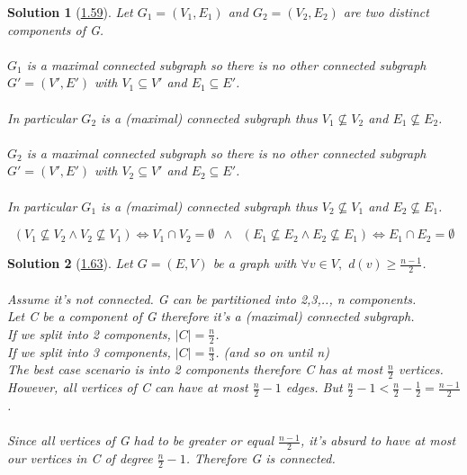 \documentclass[10pt]{report}
\numberwithin{dummy}{section}
\theoremstyle{ocrenumbox}
\newtheorem{definitionTT}{Solution}[]
\theoremstyle{grayman}
\newenvironment{sol}{\begin{sBox}\begin{definitionTT}}{\end{definitionTT}\end{sBox}}
\begin{document}
\begin{sol}[\hypertarget{so159}{\hyperlink{exo159}{1.59}}]
Let $G_1 = (V_1, E_1)$ and $G_2 = (V_2, E_2)$ are two distinct components of G.\\ \\
$G_1$ is a maximal connected subgraph so there is no other connected subgraph $G' = (V', E')$ with $V_1 \subseteq V'$ and $E_1 \subseteq E'$.\\ \\
In particular $G_2$ is a (maximal) connected subgraph thus $V_1 \not\subseteq V_2$ and $E_1 \not\subseteq E_2$.\\ \\
$G_2$ is a maximal connected subgraph so there is no other connected subgraph $G' = (V', E')$ with $V_2 \subseteq V'$ and $E_2 \subseteq E'$.\\ \\
In particular $G_1$ is a (maximal) connected subgraph thus $V_2 \not\subseteq V_1$ and $E_2 \not\subseteq E_1$.

\[\left( V_1 \not\subseteq V_2 \wedge V_2 \not\subseteq V_1\right) \Longleftrightarrow V_1 \cap V_2 = \emptyset \phantom{a} \wedge \phantom{a} \left( E_1 \not\subseteq E_2 \wedge E_2 \not\subseteq E_1\right) \Longleftrightarrow E_1 \cap E_2 = \emptyset\]
\end{sol}
\begin{sol}[\hypertarget{so163}{\hyperlink{exo163}{1.63}}]
Let $G=(E,V)$ be a graph with $\forall v \in V,$ $d(v) \geq \frac{n-1}{2}$.\\ \\
Assume it's not connected. G can be partitioned into 2,3,.., n components.\\
Let C be a component of G therefore it's a (maximal) connected subgraph.\\ 
If we split into 2 components, $\lvert C \rvert = \frac{n}{2}$.\\
If we split into 3 components, $\lvert C \rvert = \frac{n}{3}$. (and so on until n)\\
The best case scenario is into 2 components therefore C has at most $\frac{n}{2}$ vertices. \\
However, all vertices of C can have at most $\frac{n}{2}-1$ edges. But $\frac{n}{2}-1 < \frac{n}{2}-\frac{1}{2} = \frac{n-1}{2}$.\\ \\
Since all vertices of G had to be greater or equal $\frac{n-1}{2}$, it's absurd to have at most our vertices in C of degree $\frac{n}{2}-1$. Therefore G is connected.
\end{sol}
\end{document}
